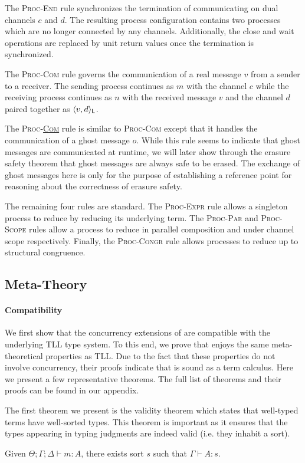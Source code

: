 The \textsc{Proc-End} rule synchronizes the termination of communicating on dual 
channels $c$ and $d$. The resulting process configuration contains two processes
which are no longer connected by any channels. Additionally, the close and wait 
operations are replaced by unit return values once the termination is synchronized.

The \textsc{Proc-Com} rule governs the communication of a real message $v$ from
a sender to a receiver. The sending process continues as $m$ with the channel
$c$ while the receiving process continues as $n$ with the received
message $v$ and the channel $d$ paired together as $\langle{{v},{d}}\rangle_{\textsf{L}}$.

The \textsc{Proc-\underline{Com}} rule is similar to \textsc{Proc-Com} except
that it handles the communication of a ghost message $o$. While this rule seems
to indicate that ghost messages are communicated at runtime, we will later show
through the erasure safety theorem that ghost messages are always safe to be erased.
The exchange of ghost messages here is only for the purpose of establishing a 
reference point for reasoning about the correctness of erasure safety.

The remaining four rules are standard. The \textsc{Proc-Expr} rule allows a
singleton process to reduce by reducing its underlying term. The \textsc{Proc-Par} and
\textsc{Proc-Scope} rules allow a process to reduce in parallel composition and
under channel scope respectively. Finally, the \textsc{Proc-Congr} rule allows
processes to reduce up to structural congruence.

\subsection{Meta-Theory}
\paragraph{\textbf{Compatibility}}
We first show that the concurrency extensions of \TLLC{} are compatible with the
underlying TLL type system. To this end, we prove that \TLLC{} enjoys the same
meta-theoretical properties as TLL. Due to the fact that these properties do not involve 
concurrency, their proofs indicate that \TLLC{} is sound as a term calculus.
Here we present a few representative theorems. The full list of theorems and their proofs
can be found in our appendix.

The first theorem we present is the validity theorem which states that
well-typed terms have well-sorted types. This theorem is important as it
ensures that the types appearing in typing judgments are indeed valid (i.e. they inhabit a sort).
\begin{theorem}[Validity]
  Given $\Theta ; \Gamma ; \Delta \vdash m : A$, there exists
  sort $s$ such that $\Gamma \vdash A : s$.
\end{theorem}


